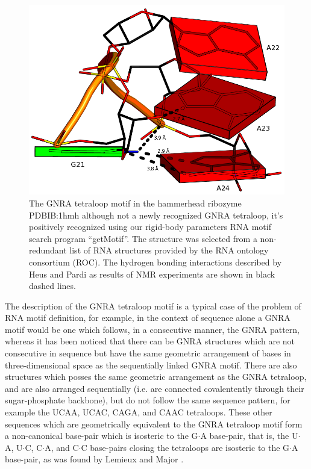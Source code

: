 \begin{figure}
\centering
\includegraphics[angle=0, scale=0.38]{Chapter5/gnra21L2.png}
\caption{The   GNRA  tetraloop  motif   in  the   hammerhead  ribozyme
  PDBIB:1hmh  \cite{pley1994}  although not  a  newly recognized  GNRA
  tetraloop,   it's  positively   recognized   using  our   rigid-body
  parameters RNA motif search  program ``getMotif''. The structure was
  selected from a non-redundant list of RNA structures provided by the
  RNA  ontology consortium (ROC).   The hydrogen  bonding interactions
  described  by  Heus and  Pardi  \cite{heus1991}  as  results of  NMR
  experiments are shown in black dashed lines.}
\label{fig:gnrablocks}
\end{figure}

The description of  the GNRA tetraloop motif is a  typical case of the
problem  of RNA  motif  definition,  for example,  in  the context  of
sequence  alone  a  GNRA  motif  would  be one  which  follows,  in  a
consecutive manner, the GNRA pattern, whereas it has been noticed that
there can be GNRA structures which are not consecutive in sequence but
have  the same  geometric  arrangement of  bases in  three-dimensional
space  as  the  sequentially   linked  GNRA  motif.   There  are  also
structures  which posses the  same geometric  arrangement as  the GNRA
tetraloop, and are also arranged sequentially (i.e.  are connected
covalentently  through  their sugar-phosphate  backbone),  but do  not
follow the  same sequence pattern,  for example the UCAA,  UCAC, CAGA,
and  CAAC tetraloops\cite{lemieux2006}.   These other  sequences which
are  geometrically  equivalent to  the  GNRA  tetraloop  motif form  a
non-canonical base-pair which is isosteric to the G$\cdot$A base-pair,
that is, the U$\cdot$A, U$\cdot$C, C$\cdot$A, and C$\cdot$C base-pairs
closing the  tetraloops are isosteric  to the G$\cdot$A  base-pair, as
was found by Lemieux and Major \cite{lemieux2006}.

